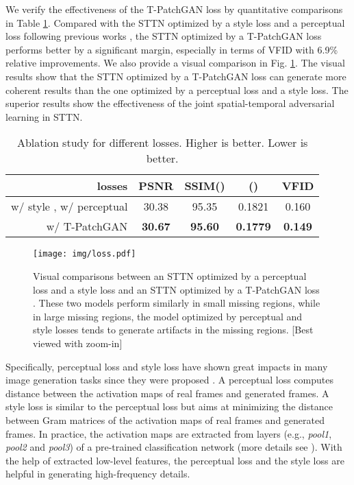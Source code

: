 \documentclass[runningheads]{llncs}
\begin{document}
We verify the effectiveness of the T-PatchGAN loss by quantitative comparisons in Table \ref{tb:ab-gan}. Compared with the STTN optimized by a style loss \cite{gatys2016image} and a perceptual loss \cite{johnson2016perceptual} following previous works \cite{lee2019copy,oh2019onion}, the STTN optimized by a T-PatchGAN loss performs better by a significant margin, especially in terms of VFID with 6.9\% relative improvements.
We also provide a visual comparison in Fig. \ref{fig:loss}. The visual results show that the STTN optimized by a T-PatchGAN loss can generate more coherent results than the one optimized by a perceptual loss and a style loss. The superior results show the effectiveness of the joint spatial-temporal adversarial learning in STTN. 

\begin{table}
   \begin{center}
   \begin{tabular}{r|c|c|c|c} 
    losses &PSNR &SSIM() & () &VFID \\\hline \hline
    w/ style \cite{gatys2016image}, w/ perceptual \cite{johnson2016perceptual} &30.38 &95.35 &0.1821 &0.160 \\\hline 
    w/ T-PatchGAN \cite{chang2019free} &\textbf{30.67} &\textbf{95.60} &\textbf{0.1779} &\textbf{0.149} \\\hline 
   \end{tabular} 
\end{center}
   \caption{Ablation study for different losses.  Higher is better.  Lower is better. }
   \label{tb:ab-gan}
\end{table}



\begin{figure}
   \begin{center}
      \texttt{[image: img/loss.pdf]}
   \end{center}
   \caption{Visual comparisons between an STTN optimized by a perceptual loss \cite{johnson2016perceptual} and a style loss \cite{gatys2016image} and an STTN optimized by a T-PatchGAN loss \cite{chang2019free}. These two models perform similarly in small missing regions, while in large missing regions, the model optimized by perceptual and style losses tends to generate artifacts in the missing regions. [Best viewed with zoom-in]}
   \label{fig:loss}
\end{figure}

Specifically, perceptual loss and style loss have shown great impacts in many image generation tasks since they were proposed \cite{gatys2016image,johnson2016perceptual,liu2018image}. 
A perceptual loss computes  distance between the activation maps of real frames and generated frames. A style loss is similar to the perceptual loss but aims at minimizing the  distance between Gram matrices of the activation maps of real frames and generated frames. In practice, the activation maps are extracted from layers (e.g., \textsl{pool1}, \textsl{pool2} and \textsl{pool3}) of a pre-trained classification network (more details see \cite{lee2019copy,liu2018image,oh2019onion}). With the help of extracted low-level features, the perceptual loss and the style loss are helpful in generating high-frequency details. 
\end{document}
